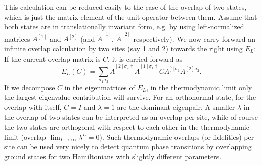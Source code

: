 \documentclass[a4paper,10pt,oneside,onecolumn,1p,times]{elsarticle}
\begin{document}
This calculation can be reduced easily to the case of the overlap of two states, which is just the matrix element of the unit operator between them. Assume that both states are in translationally invariant form, e.g. by using left-normalized matrices $A^{[1]}$ and $A^{[2]}$ (and $\tilde{A}^{[1]}$, $\tilde{A}^{[2]}$ respectively). We now carry forward an infinite overlap calculation by two sites (say 1 and 2) towards the right using $E_L$: If the current overlap matrix is $C$, it is carried forward as
\begin{equation}
E_L (C) = \sum_{\sigma_1\sigma_2} \tilde{A}^{[2]\sigma_2\dagger} \tilde{A}^{[1]\sigma_1\dagger} C A^{[1[\sigma_1} A^{[2]\sigma_2} .
\end{equation}  
If we decompose $C$ in the eigenmatrices of $E_L$, in the thermodynamic limit only the largest eigenvalue contribution will survive. For an orthonormal state, for the overlap with itself, $C=I$ and $\lambda=1$ are the dominant eigenpair. A smaller $\lambda$ in the overlap of two states can be interpreted as an overlap per site, while of course the two states are orthogonal with respect to each other in the thermodynamic limit (overlap $\lim_{L\rightarrow\infty} \lambda^L = 0$). Such thermodynamic overlaps (or fidelities) per site can be used very nicely to detect quantum phase transitions by overlapping ground states for two Hamiltonians with slightly different parameters\cite{McCulloch08}.
 
\end{document}
